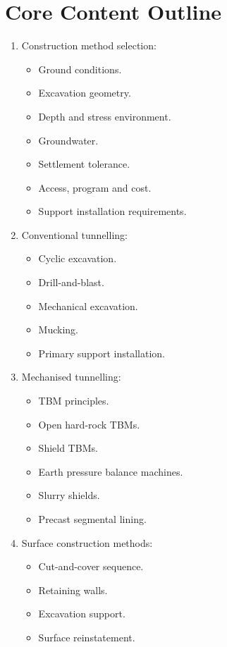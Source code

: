 \documentclass[12pt,oneside]{book}
\begin{document}
\section{Core Content Outline}
\begin{enumerate}
    \item Construction method selection:
    \begin{itemize}
        \item Ground conditions.
        \item Excavation geometry.
        \item Depth and stress environment.
        \item Groundwater.
        \item Settlement tolerance.
        \item Access, program and cost.
        \item Support installation requirements.
    \end{itemize}
    \item Conventional tunnelling:
    \begin{itemize}
        \item Cyclic excavation.
        \item Drill-and-blast.
        \item Mechanical excavation.
        \item Mucking.
        \item Primary support installation.
    \end{itemize}
    \item Mechanised tunnelling:
    \begin{itemize}
        \item TBM principles.
        \item Open hard-rock TBMs.
        \item Shield TBMs.
        \item Earth pressure balance machines.
        \item Slurry shields.
        \item Precast segmental lining.
    \end{itemize}
    \item Surface construction methods:
    \begin{itemize}
        \item Cut-and-cover sequence.
        \item Retaining walls.
        \item Excavation support.
        \item Surface reinstatement.

\end{itemize}
\end{enumerate}
\end{document}
